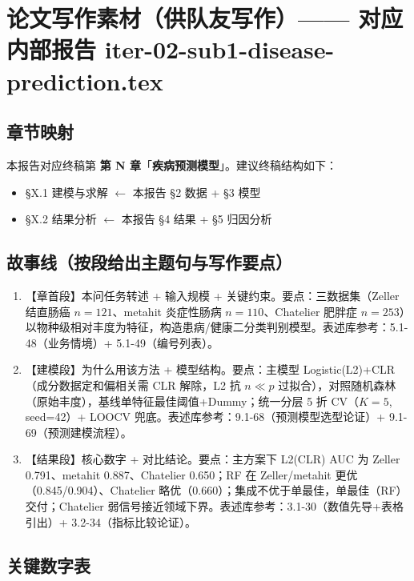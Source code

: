 \documentclass{article}
\begin{document}
\section{论文写作素材（供队友写作）—— 对应内部报告 iter-02-sub1-disease-prediction.tex}

\subsection{章节映射}

本报告对应终稿第 \textbf{第 N 章}「\textbf{疾病预测模型}」。建议终稿结构如下：
\begin{itemize}
  \item §X.1 建模与求解 \quad $\leftarrow$ 本报告 §2 数据 + §3 模型
  \item §X.2 结果分析 \quad $\leftarrow$ 本报告 §4 结果 + §5 归因分析
\end{itemize}

\subsection{故事线（按段给出主题句与写作要点）}

\begin{enumerate}
  \item 【章首段】本问任务转述 + 输入规模 + 关键约束。要点：三数据集（Zeller 结直肠癌 $n=121$、metahit 炎症性肠病 $n=110$、Chatelier 肥胖症 $n=253$）以物种级相对丰度为特征，构造患病/健康二分类判别模型。表述库参考：5.1-48（业务情境）+ 5.1-49（编号列表）。
  \item 【建模段】为什么用该方法 + 模型结构。要点：主模型 Logistic(L2)+CLR（成分数据定和偏相关需 CLR 解除，L2 抗 $n\ll p$ 过拟合），对照随机森林（原始丰度），基线单特征最佳阈值+Dummy；统一分层 5 折 CV（$K=5$, seed=42）+ LOOCV 兜底。表述库参考：9.1-68（预测模型选型论证）+ 9.1-69（预测建模流程）。
  \item 【结果段】核心数字 + 对比结论。要点：主方案下 L2(CLR) AUC 为 Zeller 0.791、metahit 0.887、Chatelier 0.650；RF 在 Zeller/metahit 更优（0.845/0.904）、Chatelier 略优（0.660）；集成不优于单最佳，单最佳（RF）交付；Chatelier 弱信号接近领域下界。表述库参考：3.1-30（数值先导+表格引出）+ 3.2-34（指标比较论证）。
\end{enumerate}

\subsection{关键数字表}
\end{document}
